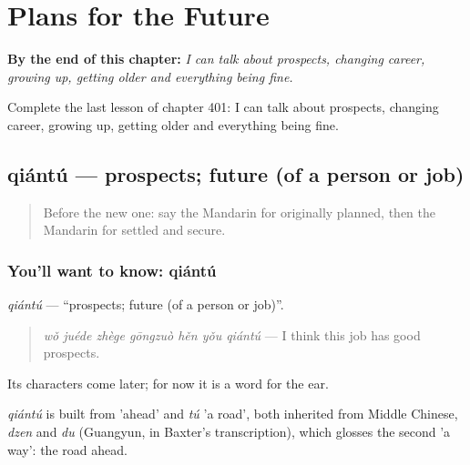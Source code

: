 
\chapter{Plans for the Future}
\label{ch:zh-plans-for-the-future}

\begin{chapteropening}
\textbf{By the end of this chapter:} \emph{I can talk about prospects, changing career, growing up, getting older and everything being fine.}

Complete the last lesson of chapter 401: I can talk about prospects, changing career, growing up, getting older and everything being fine.
\end{chapteropening}

\section[qiántú]{qiántú — prospects; future (of a person or job)}

\label{lesson:ZH-C401-qiantu}



\begin{quote}
Before the new one: say the Mandarin for originally planned, then the Mandarin for settled and secure.
\end{quote}

\subsection*{You'll want to know: qiántú}
\emph{qiántú} — \textquotedblleft{}prospects; future (of a person or job)\textquotedblright{}.

\begin{quote}
\emph{wǒ juéde zhège gōngzuò hěn yǒu qiántú} — I think this job has good prospects.
\end{quote}

Its characters come later; for now it is a word for the ear.

\begin{cousinweb}
\emph{qiántú} is built from  'ahead' and \emph{tú} 'a road', both inherited from Middle Chinese, \emph{dzen} and \emph{du} (Guangyun, in Baxter's transcription), which glosses the second 'a way': the road ahead.
\end{cousinweb}


